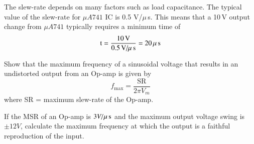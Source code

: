 The slew-rate depends on many factors such as load capacitance. The typical value of the slew-rate for $\mu A741$ IC is 0.5 V/$\mu$\,s. This means that a 10\,V output change from $\mu A741$ typically requires a minimum time of
$$
\text{t}=\frac{10\text{\,V}}{0.5\text{\,V/}\mu\text{\,s}}=20\,\mu\text{\,s}
$$

\smallskip

\begin{example}\label{exam5.1}
Show that the maximum frequency of a sinusoidal voltage that results in an undistorted output from an Op-amp is given by
$$
f_{\max}=\frac{\text{SR}}{2\pi V_{m}}
$$
where SR = maximum slew-rate of the Op-amp.
\end{example}


\begin{example}\label{exam5.2}
If the MSR of an Op-amp is $3V/\mu\text{\,s}$ and the maximum output voltage swing is $\pm 12 V$, calculate the maximum frequency at which the output is a faithful reproduction of the input.
\end{example}

